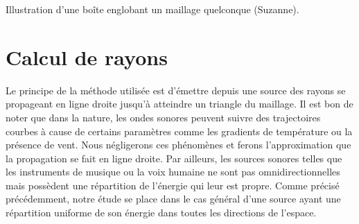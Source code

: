 \begin{figureth}
\begin{subfigureth}{0.35\textwidth}
		\label{boîteenglobante2}
	\end{subfigureth}
	\caption{Illustration d'une boîte englobant un maillage quelconque (Suzanne).}
\end{figureth}


\section{Calcul de rayons} \label{sect_rayon}


Le principe de la méthode utilisée est d'émettre depuis une source des rayons se propageant en ligne droite jusqu'à atteindre un triangle du maillage. Il est bon de noter que dans la nature, les ondes sonores peuvent suivre des trajectoires courbes à cause de certains paramètres comme les gradients de température ou la présence de vent. Nous négligerons ces phénomènes et ferons l'approximation que la propagation se fait en ligne droite. Par ailleurs, les sources sonores telles que les instruments de musique ou la voix humaine ne sont pas omnidirectionnelles mais possèdent une répartition de l'énergie qui leur est propre. Comme précisé précédemment, notre étude se place dans le cas général d'une source ayant une répartition uniforme de son énergie dans toutes les directions de l'espace.


